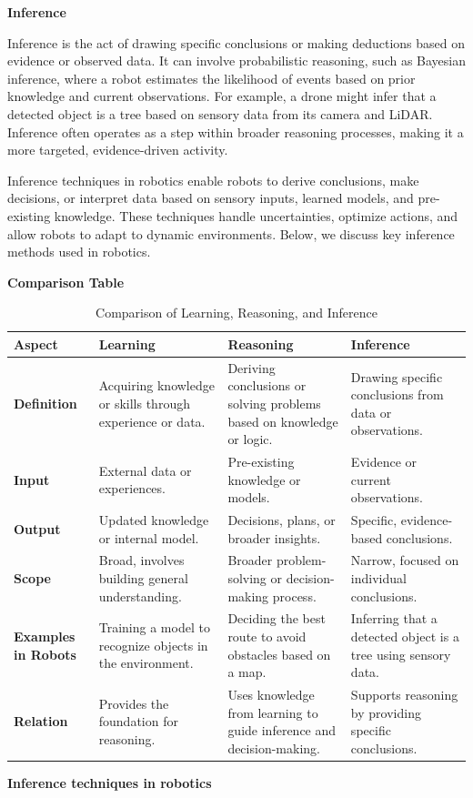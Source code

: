 \documentclass{book}
\providecommand{\ProjectDeepHeading}[2]{%
    \par\medskip\noindent\textbf{#2}\par\smallskip
}
\begin{document}
\ProjectDeepHeading{3}{Inference}
Inference is the act of drawing specific conclusions or making deductions based on evidence or observed data. It can involve probabilistic reasoning, such as Bayesian inference, where a robot estimates the likelihood of events based on prior knowledge and current observations. For example, a drone might infer that a detected object is a tree based on sensory data from its camera and LiDAR. Inference often operates as a step within broader reasoning processes, making it a more targeted, evidence-driven activity. 

Inference techniques in robotics enable robots to derive conclusions, make decisions, or interpret data based on sensory inputs, learned models, and pre-existing knowledge. These techniques handle uncertainties, optimize actions, and allow robots to adapt to dynamic environments. Below, we discuss key inference methods used in robotics.



\ProjectDeepHeading{4}{Comparison Table}
\begin{table}[h!]
    \centering
    \begin{tabular}{|l|l|l|l|}
        \hline
        \textbf{Aspect} & \textbf{Learning} & \textbf{Reasoning} & \textbf{Inference} \\ \hline
        \textbf{Definition} & Acquiring knowledge or skills through experience or data. & Deriving conclusions or solving problems based on knowledge or logic. & Drawing specific conclusions from data or observations. \\ \hline
        \textbf{Input} & External data or experiences. & Pre-existing knowledge or models. & Evidence or current observations. \\ \hline
        \textbf{Output} & Updated knowledge or internal model. & Decisions, plans, or broader insights. & Specific, evidence-based conclusions. \\ \hline
        \textbf{Scope} & Broad, involves building general understanding. & Broader problem-solving or decision-making process. & Narrow, focused on individual conclusions. \\ \hline
        \textbf{Examples in Robots} & Training a model to recognize objects in the environment. & Deciding the best route to avoid obstacles based on a map. & Inferring that a detected object is a tree using sensory data. \\ \hline
        \textbf{Relation} & Provides the foundation for reasoning. & Uses knowledge from learning to guide inference and decision-making. & Supports reasoning by providing specific conclusions. \\ \hline
    \end{tabular}
    \caption{Comparison of Learning, Reasoning, and Inference}
\end{table}
\ProjectDeepHeading{4}{Inference techniques in robotics}
\end{document}
